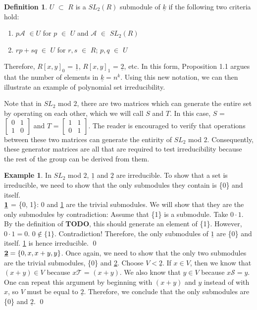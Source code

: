 \documentclass[a4paper,draft]{amsproc}
\theoremstyle{plain}
\theoremstyle{definition}
\newtheorem{exm}{Example}[section]
\newtheorem{dfn}{Definition}[section]
\theoremstyle{remark}
\numberwithin{equation}{section}
\begin{document}
\begin{dfn}
$U$ $\subset$ $R$ is a  $SL_{2}(R)$ submodule of $\underline{k}$ if the following two criteria hold: 

\begin{enumerate}
  \item $p  \mathcal{A}$ $\in U$ for $p$ $\in$ $U$ and $\mathcal{A}$ $\in$ $SL_{2}(R)$ 
  \item $rp + sq$ $\in$ $U$ for $r, s$ $\in$ $R$; $p, q$ $\in$ $U$
\end{enumerate}

\end{dfn}
Therefore, $R[x,y]_{0}$ = $\underline{1}$, $R[x,y]_{1}$ = $\underline{2}$, etc. In this form, Proposition 1.1 argues that the number of elements in $\underline{k} =  n^{k}$.  Using this new notation, we can then illustrate an example of polynomial set irreducibility. 

Note that in $SL_{2}$ mod $2$, there are two matrices which can generate the entire set by operating on each other, which we will call $S$ and $T$. In this case, $S$ = 
$\begin{bmatrix}
 0&1 \\ 
 1&0 
\end{bmatrix}$ and $T$ = $\begin{bmatrix}
 1&1 \\ 
 0&1 
\end{bmatrix}$. The reader is encouraged to verify that operations between these two matrices can generate the entirity of $SL_{2}$ mod $2$. Consequently, these generator matrices are all that are required to test irreducibility because the rest of the group can be derived from them. 

\begin{exm}
In  $SL_{2}$ mod $2$, $\underline{1}$ and $\underline{2}$ are irreducible.
To show that a set is irreducible, we need to show that the only submodules they contain is \{0\} and itself. \\

$\textbf{\underline{1}}$ = \{0, 1\}: 0 and \underline{1} are the trivial submodules. We will show that they are the only submodules by contradiction: Assume that \{1\} is a submodule. Take $0 \cdot 1$. By the definition of \textbf{TODO}, this should generate an element of \{1\}. However, $ 0 \cdot 1 = 0$. $0 \not\in \{1\}$. Contradiction! Therefore, the only submodules of $\underline{1}$ are \{0\} and itself. \underline{1} is hence irreducible. \qed \\

$\textbf{\underline{2}} = \{0, x, x + y, y\}$. Once again, we need to show that the only two submodules are the trivial submodules, \{0\} and \underline{2}. Choose $V < \underline{2}$. If $x \in V$, then we know that $(x + y) \in V$ because $x\mathcal{T}$ = $(x + y)$. We also know that $y \in V$ because $x\mathcal{S} = y$. One can repeat this argument by beginning with $(x + y)$ and $y$ instead of with $x$, so $V$ must be equal to $\underline{2}$. Therefore, we conclude that the only submodules are \{0\} and $\underline{2}$. \qed

\end{exm}
\end{document}
